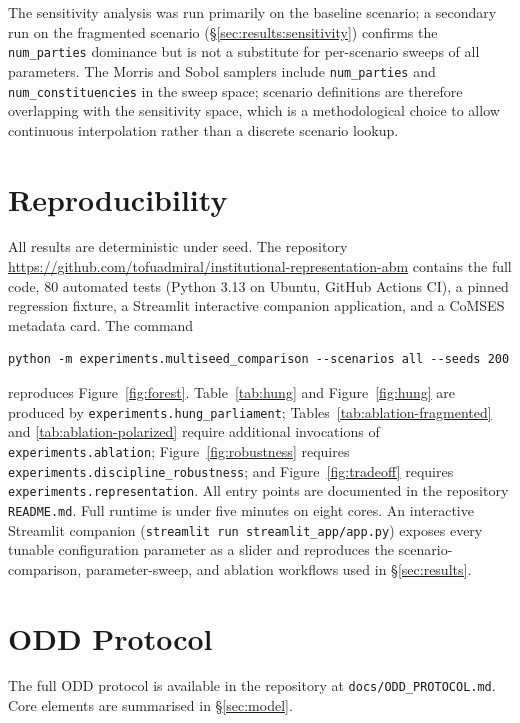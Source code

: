 \documentclass[11pt]{article}
\begin{document}
The sensitivity analysis was run primarily on the baseline scenario; a
secondary run on the fragmented scenario (\S\ref{sec:results:sensitivity}) confirms
the \texttt{num\_parties} dominance but is not a substitute for per-scenario
sweeps of all parameters. The Morris and Sobol samplers include
\texttt{num\_parties} and \texttt{num\_constituencies} in the sweep space;
scenario definitions are therefore overlapping with the sensitivity space,
which is a methodological choice to allow continuous interpolation rather
than a discrete scenario lookup.

\section{Reproducibility}
\label{sec:reproducibility}

All results are deterministic under seed. The repository
\url{https://github.com/tofuadmiral/institutional-representation-abm} contains
the full code, $80$ automated tests (Python 3.13 on Ubuntu, GitHub Actions
CI), a pinned regression fixture, a Streamlit interactive companion
application, and a CoMSES metadata card. The command
\begin{verbatim}
python -m experiments.multiseed_comparison --scenarios all --seeds 200
\end{verbatim}
reproduces Figure~\ref{fig:forest}.
Table~\ref{tab:hung} and Figure~\ref{fig:hung} are produced by
\texttt{experiments.hung\_parliament};
Tables~\ref{tab:ablation-fragmented} and \ref{tab:ablation-polarized}
require additional invocations of \texttt{experiments.ablation};
Figure~\ref{fig:robustness} requires
\texttt{experiments.discipline\_robustness}; and
Figure~\ref{fig:tradeoff} requires \texttt{experiments.representation}.
All entry points are documented in the repository \texttt{README.md}.
Full runtime is under five minutes on eight cores. An interactive
Streamlit companion (\texttt{streamlit run streamlit\_app/app.py})
exposes every tunable configuration parameter as a slider and reproduces
the scenario-comparison, parameter-sweep, and ablation workflows used in
\S\ref{sec:results}.

\appendix

\section{ODD Protocol}
\label{app:odd}

The full ODD protocol \citep{grimm2010, grimm2020} is available in the
repository at \texttt{docs/ODD\_PROTOCOL.md}. Core elements are summarised
in \S\ref{sec:model}.



\end{document}
